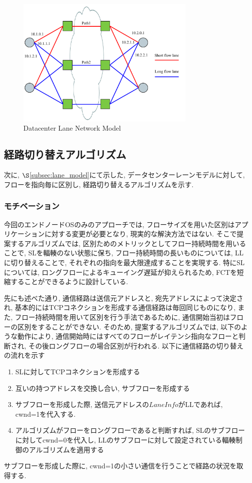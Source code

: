 \begin{figure}[t]
    \begin{center}
    \includegraphics[autoebb, width=250pt]{./img/lane_model.pdf}
    \caption{Datacenter Lane Network Model}
    \label{fig:lane_model}
    \end{center}
\end{figure}

\subsection{経路切り替えアルゴリズム}
次に, $\S$\ref{subsec:lane_model}にて示した, データセンターレーンモデルに対して, フローを指向毎に区別し, 
経路切り替えるアルゴリズムを示す.
\subsubsection{モチベーション}
今回のエンドノードOSのみのアプローチでは, フローサイズを用いた区別はアプリケーションに対する変更が必要となり, 現実的な解決方法ではない. 
そこで提案するアルゴリズムでは, 区別ためのメトリックとしてフロー持続時間を用いることで, SLを輻輳のない状態に保ち, フロー持続時間の長いものについては,
LLに切り替えることで, それぞれの指向を最大限達成することを実現する. 
特にSLについては, ロングフローによるキューイング遅延が抑えられるため, FCTを短縮することができるように設計している. 

先にも述べた通り, 通信経路は送信元アドレスと, 宛先アドレスによって決定され, 基本的にはTCPコネクションを形成する通信経路は毎回同じものになり,
また, フロー持続時間を用いて区別を行う手法であるために, 通信開始当初はフローの区別をすることができない. 
そのため, 提案するアルゴリズムでは, 以下のような動作により,
通信開始時にはすべてのフローがレイテンシ指向なフローと判断され, その後ロングフローの場合区別が行われる. 
以下に通信経路の切り替えの流れを示す
\begin{enumerate}
\item SLに対してTCPコネクションを形成する
\item 互いの持つアドレスを交換し合い, サブフローを形成する
\item サブフローを形成した際, 送信元アドレスの$Lane Info$がLLであれば, cwnd=1を代入する. 
\item アルゴリズムがフローをロングフローであると判断すれば,  SLのサブフローに対してcwnd=0を代入し,
LLのサブフローに対して設定されている輻輳制御のアルゴリズムを適用する
\end{enumerate} 
サブフローを形成した際に, cwnd=1の小さい通信を行うことで経路の状況を取得する. 

